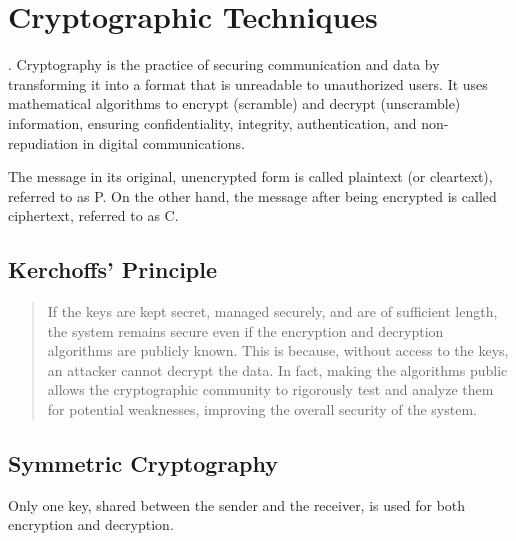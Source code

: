 \chapter{Cryptographic Techniques}
\cite{02_basic_crypto}.
Cryptography is the practice of securing communication and data by transforming it into a format that is unreadable to unauthorized users. It uses mathematical algorithms to encrypt (scramble) and decrypt (unscramble) information, ensuring confidentiality, integrity, authentication, and non-repudiation in digital communications.

The message in its original, unencrypted form is called plaintext (or cleartext), referred to as P. On the other hand, the message after being encrypted is called ciphertext, referred to as C. 

\section{Kerchoffs' Principle}
\begin{quotation}
    If the keys are kept secret, managed securely, and are of sufficient length, the system remains secure even if the encryption and decryption algorithms are publicly known. This is because, without access to the keys, an attacker cannot decrypt the data. In fact, making the algorithms public allows the cryptographic community to rigorously test and analyze them for potential weaknesses, improving the overall security of the system.
\end{quotation}

\section{Symmetric Cryptography}
\begin{center}
    Only one key, shared between the sender and the receiver, is used for both encryption and decryption. 
\end{center}



